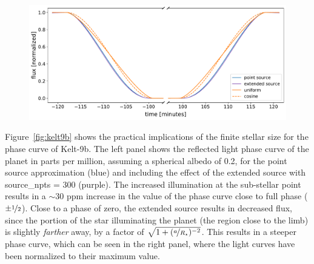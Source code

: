 \documentclass[modern]{aastex62}
\begin{document}
\begin{figure}[p!]
    \begin{centering}
        \includegraphics[width=\linewidth]{figures/kelt9b_eclipse.pdf}
    \end{centering}
\end{figure}

Figure~\ref{fig:kelt9b} shows the practical implications of the finite
stellar size for the phase curve of Kelt-9b. The left panel shows the
reflected light phase curve of the planet in parts per million, assuming
a spherical albedo of 0.2, for the point source approximation
(blue) and including the effect of the extended source with
\textsf{source\_npts} = 300 (purple). The increased
illumination at the sub-stellar point results in a ${\sim}30$ ppm increase
in the value of the phase curve close to full phase ($\pm\nicefrac{1}{2}$).
Close to a phase of zero, the extended source results in decreased
flux, since the portion of the star illuminating the planet (the region
close to the limb) is slightly
\emph{farther} away, by a factor of
$\sqrt{1 + (\nicefrac{a}{R_\star})^{-2}}$. This results in a steeper
phase curve, which can be seen in the right panel, where the light curves
have been normalized to their maximum value.
\end{document}
